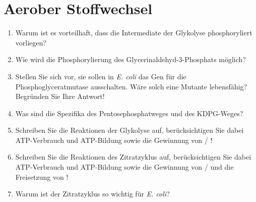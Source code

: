 
\section{Aerober Stoffwechsel}
\begin{enumerate}
	\item Warum ist es vorteilhaft, dass die Intermediate der Glykolyse phosphoryliert vorliegen?
	\item Wie wird die Phosphorylierung des Glycerinaldehyd-3-Phosphats möglich?
	\item Stellen Sie sich vor, sie sollen in \emph{E. coli} das Gen für die Phosphoglyceratmutase ausschalten. Wäre solch eine Mutante lebensfähig? Begründen Sie Ihre Antwort!
	\item Was sind die Spezifika des Pentosephosphatweges und des KDPG-Weges?
	\item Schreiben Sie die Reaktionen der Glykolyse auf, berücksichtigen Sie dabei ATP-Verbrauch und ATP-Bildung sowie die Gewinnung von  / !
	\item Schreiben Sie die Reaktionen des Zitratzyklus auf, berücksichtigen Sie dabei ATP-Verbrauch und ATP-Bildung sowie die Gewinnung von  /  und die Freisetzung von !
	\item Warum ist der Zitratzyklus so wichtig für \emph{E. coli}?
\end{enumerate}
